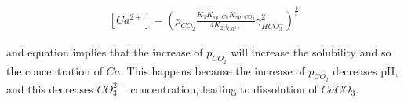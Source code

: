 \documentclass[11pt,twoside]{report}
\begin{document}
\begin{align}\label{caco2}
  [Ca^{2+}] = \left(p_{CO_{2}}\frac{K_{1} K_{sp \cdot Ca} K_{sp \cdot CO_{2}} }{4 K_{2} \gamma_{Ca^{2+}}} \gamma^{2}_{HCO_{3}^{-}} \right)^{\frac{1}{3}}
\end{align}

and equation \label{caco2} implies that the increase of $p_{CO_{2}}$ will increase the solubility and so the concentration of $Ca$. This happens because the increase of $p_{CO_{2}}$ decreases pH, and this decreases $CO_{3}^{2-}$ concentration, leading to dissolution of $CaCO_{3}$. 




\end{document}
